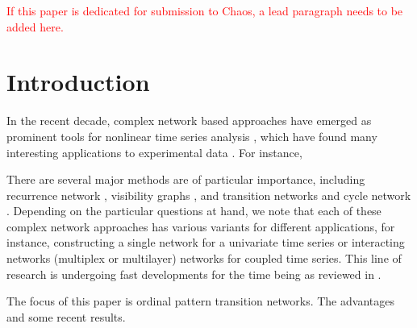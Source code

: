 \documentclass[12pt,aip,cha,reprint,nofootinbib]{revtex4-1}
\begin{document}
\maketitle

\textcolor{red}{If this paper is dedicated for submission to Chaos, a lead paragraph needs to be added here.}

\section{Introduction}
In the recent decade, complex network based approaches have emerged as prominent tools for nonlinear time series analysis \cite{Kantz97,Sprott2003}, which have found many interesting applications to experimental data \cite{ZouPR2018}. For instance, 

There are several major methods are of particular importance, including recurrence network \cite{MarwanPLA2009,Donner2010a}, visibility graphs \cite{Lacasa2008,Nunez2012}, and transition networks \cite{Nicolis2005} and cycle network \cite{ZhangPRL2006}. Depending on the particular questions at hand, we note that each of these complex network approaches has various variants for different applications, for instance, constructing a single network for a univariate time series or interacting networks (multiplex or multilayer) networks for coupled time series. This line of research is undergoing fast developments for the time being as reviewed in \cite{ZouPR2018}. 

The focus of this paper is ordinal pattern transition networks. The advantages and some recent results. 
\end{document}
